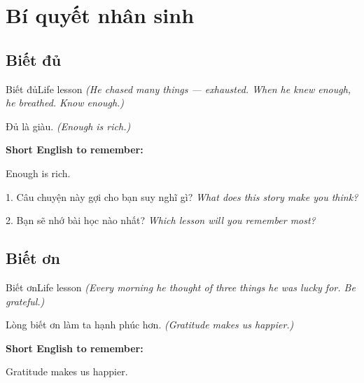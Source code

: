 \chapter{Bí quyết nhân sinh}


\section{Biết đủ}
\begin{truyen}{Biết đủ}{Life lesson}
\textit{(He chased many things — exhausted. When he knew enough, he breathed. Know enough.)}
\end{truyen}

\begin{baihoc}
Đủ là giàu.
\textit{(Enough is rich.)}
\end{baihoc}

\begin{ghinhoanh}
\textbf{Short English to remember:}

Enough is rich.

\end{ghinhoanh}

\begin{tuhocnhanh}
1. Câu chuyện này gợi cho bạn suy nghĩ gì? \textit{What does this story make you think?}

2. Bạn sẽ nhớ bài học nào nhất? \textit{Which lesson will you remember most?}
\end{tuhocnhanh}
\ngancach


\section{Biết ơn}
\begin{truyen}{Biết ơn}{Life lesson}
\textit{(Every morning he thought of three things he was lucky for. Be grateful.)}
\end{truyen}

\begin{baihoc}
Lòng biết ơn làm ta hạnh phúc hơn.
\textit{(Gratitude makes us happier.)}
\end{baihoc}

\begin{ghinhoanh}
\textbf{Short English to remember:}

Gratitude makes us happier.

\end{ghinhoanh}

